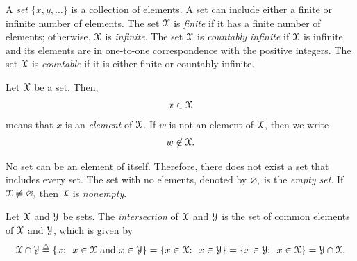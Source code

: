 A {\it set} $\{x,y,\ldots\}$ is a collection of elements.
A set can include either a finite or infinite number of elements.
The set ${\mathcal X}$ is {\it finite} if it has a finite number of elements; otherwise, ${\mathcal X}$ is {\it infinite}.
%
The set ${\mathcal X}$ is {\it countably infinite} if ${\mathcal X}$ is infinite and its elements are in one-to-one correspondence with the positive integers. The set ${\mathcal X}$ is {\it countable} if it is either finite or countably infinite.

Let ${\mathcal X}$ be a set.
Then, \begin{align}x\in {\mathcal X}\end{align} means that $x$ is an {\it element}
\label{insym}%
%
of ${\mathcal X}$. If $w$ is not an element of ${\mathcal X}$, then we write
\begin{align}w\not\in {\mathcal X}.\end{align}
\label{notinsym}

No set can be an element of itself.  Therefore, there does not exist a set that includes every set.  The set with no elements, denoted by $\varnothing\mspace{-1mu},$ is the {\it empty set}.
%
\label{varnothingsym}%
%
%
If ${\mathcal X}\not=\varnothing\mspace{-1mu},$ then ${\mathcal X}$ is {\it nonempty}.

Let ${\mathcal X}$ and ${\mathcal Y}$ be sets. The {\it intersection}
%
of ${\mathcal X}$ and ${\mathcal Y}$ is the set of common elements of ${\mathcal X}$ and
${\mathcal Y}$, which is given by
\begin{align}
\SX\cap \SY
%
\isdef\{x\mspace{-1mu}\colon\ x\in \SX \mbox{ and } x\in \SY \}
%
=  \{ x\in \SX \mspace{-2mu}\colon\ x\in \SY \}
%
=\{x\in \SY\mspace{-2mu}\colon\ x\in \SX \}
%
= \SY \cap \SX,\end{align}

